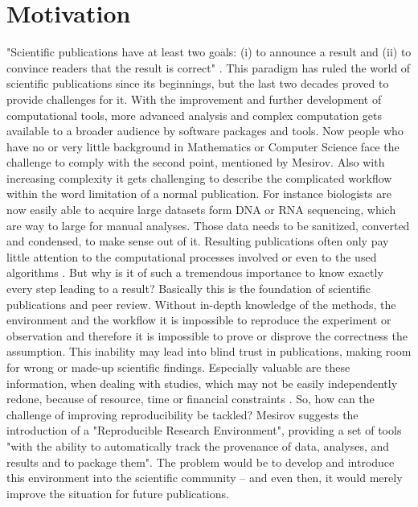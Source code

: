\section{Motivation}
"Scientific publications have at least two goals: (i) to announce a result and (ii) to convince readers that the result is correct" \citep{Mesirov2010}.
This paradigm has ruled the world of scientific publications since its beginnings, but the last two decades proved to provide challenges for it. With the improvement and further development of computational tools, more advanced analysis and complex computation gets available to a broader audience by software packages and tools. Now people who have no or very little background in Mathematics or Computer Science face the challenge to comply with the second point, mentioned by Mesirov. Also with increasing complexity it gets challenging to describe the complicated workflow within the word limitation of a normal publication.
For instance biologists are now easily able to acquire large datasets form DNA or RNA sequencing, which are way to large for manual analyses. Those data needs to be sanitized, converted and condensed, to make sense out of it. Resulting publications often only pay little attention to the computational processes involved or even to the used algorithms \citep{Peng2011}.
But why is it of such a tremendous importance to know exactly every step leading to a result? Basically this is the foundation of scientific publications and peer review. Without in-depth knowledge of the methods, the environment and the workflow it is impossible to reproduce the experiment or observation and therefore it is impossible to prove or disprove the correctness the assumption. This inability may lead into blind trust in publications, making room for wrong or made-up scientific findings.
Especially valuable are these information, when dealing with studies, which may not be easily independently redone, because of resource, time or financial constraints \citep{Peng2011}.
So, how can the challenge of improving reproducibility be tackled? Mesirov \citep{Mesirov2010} suggests the introduction of a "Reproducible Research Environment", providing a set of tools "with the ability to automatically track the provenance of data, analyses, and results and to package them".
The problem would be to develop and introduce this environment into the scientific community -- and even then, it would merely improve the situation for future publications.

